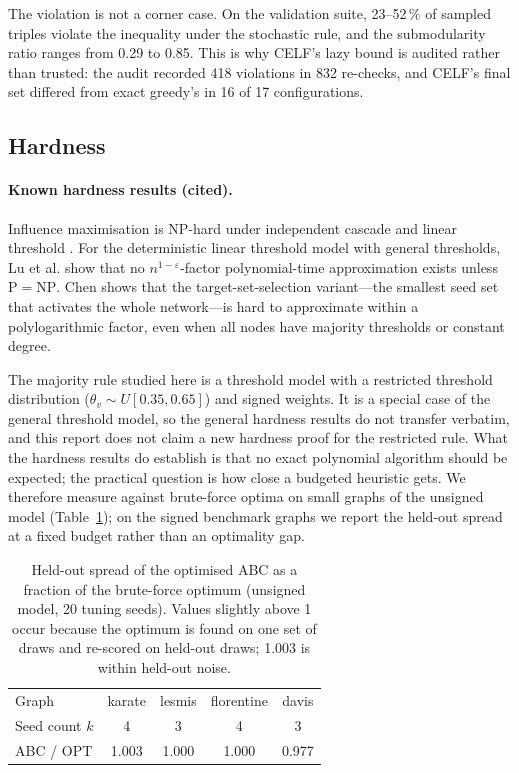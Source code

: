 \documentclass[journal,letterpaper,10pt]{IEEEtran}
\begin{document}
The violation is not a corner case. On the validation suite, 23--52\,\% of sampled triples violate the inequality under the stochastic rule, and the submodularity ratio ranges from 0.29 to 0.85. This is why CELF's lazy bound is audited rather than trusted: the audit recorded 418 violations in 832 re-checks, and CELF's final set differed from exact greedy's in 16 of 17 configurations.

\subsection{Hardness}

\paragraph{Known hardness results (cited).}
Influence maximisation is NP-hard under independent cascade and linear threshold \cite{kempe2003}. For the deterministic linear threshold model with general thresholds, Lu et al. \cite{lu2012} show that no $n^{1-\varepsilon}$-factor polynomial-time approximation exists unless $\mathrm{P}=\mathrm{NP}$. Chen \cite{chen2009} shows that the target-set-selection variant---the smallest seed set that activates the whole network---is hard to approximate within a polylogarithmic factor, even when all nodes have majority thresholds or constant degree.

The majority rule studied here is a threshold model with a restricted threshold distribution ($\theta_v\sim U[0.35,0.65]$) and signed weights. It is a special case of the general threshold model, so the general hardness results do not transfer verbatim, and this report does not claim a new hardness proof for the restricted rule. What the hardness results do establish is that no exact polynomial algorithm should be expected; the practical question is how close a budgeted heuristic gets. We therefore measure against brute-force optima on small graphs of the unsigned model (Table~\ref{tab:opt}); on the signed benchmark graphs we report the held-out spread at a fixed budget rather than an optimality gap.

\begin{table}[!t]
\centering
\caption{Held-out spread of the optimised ABC as a fraction of the brute-force optimum (unsigned model, 20 tuning seeds). Values slightly above 1 occur because the optimum is found on one set of draws and re-scored on held-out draws; 1.003 is within held-out noise.}
\label{tab:opt}
\footnotesize
\setlength{\tabcolsep}{4pt}
\begin{tabular}{@{}lcccc@{}}
\toprule
Graph & karate & lesmis & florentine & davis\\
Seed count $k$ & 4 & 3 & 4 & 3\\
ABC / OPT & 1.003 & 1.000 & 1.000 & 0.977\\
\bottomrule
\end{tabular}
\end{table}
\end{document}
